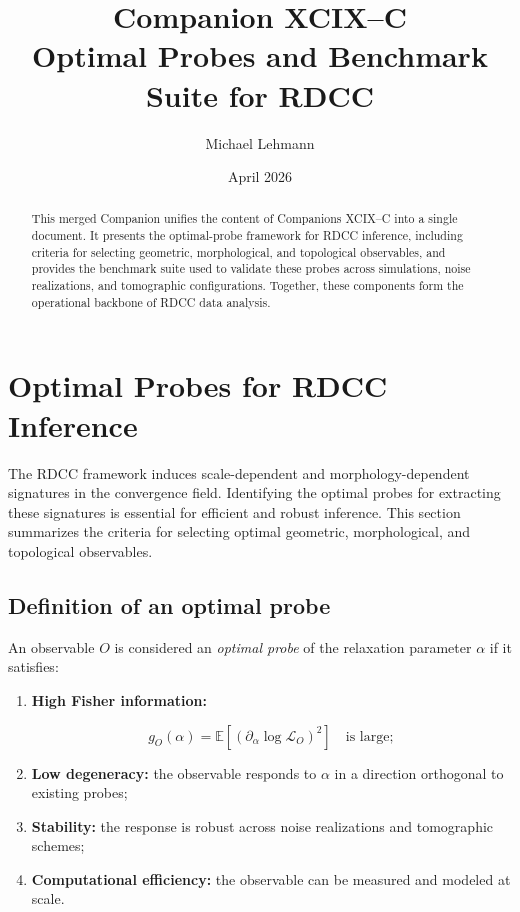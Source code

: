 \documentclass[11pt,a4paper]{article}
\title{\textbf{Companion XCIX--C \\ Optimal Probes and Benchmark Suite for RDCC}}
\author[1]{Michael Lehmann}
\affil[1]{Independent Researcher}
\date{April 2026}
\begin{document}
\maketitle

\begin{abstract}
This merged Companion unifies the content of Companions XCIX--C into a single 
document. It presents the optimal-probe framework for RDCC inference, including 
criteria for selecting geometric, morphological, and topological observables, 
and provides the benchmark suite used to validate these probes across 
simulations, noise realizations, and tomographic configurations. Together, 
these components form the operational backbone of RDCC data analysis.
\end{abstract}
\section{Optimal Probes for RDCC Inference}

The RDCC framework induces scale-dependent and morphology-dependent signatures 
in the convergence field. Identifying the optimal probes for extracting these 
signatures is essential for efficient and robust inference. This section 
summarizes the criteria for selecting optimal geometric, morphological, and 
topological observables.

\subsection{Definition of an optimal probe}

An observable $O$ is considered an \emph{optimal probe} of the relaxation 
parameter $\alpha$ if it satisfies:
\begin{enumerate}
    \item \textbf{High Fisher information:}
    

\[
    g_O(\alpha) = 
    \mathbb{E}\!\left[
        (\partial_\alpha \log \mathcal{L}_O)^2
    \right]
    \quad \text{is large};
    \]



    \item \textbf{Low degeneracy:}
    the observable responds to $\alpha$ in a direction orthogonal to existing 
    probes;

    \item \textbf{Stability:}
    the response is robust across noise realizations and tomographic schemes;

    \item \textbf{Computational efficiency:}
    the observable can be measured and modeled at scale.
\end{enumerate}
\end{document}
